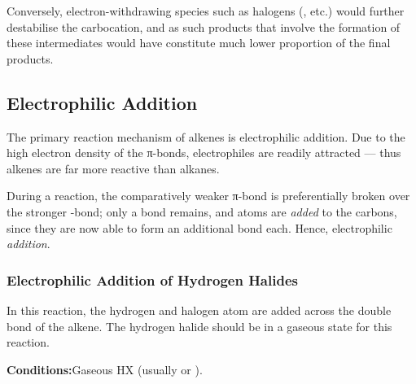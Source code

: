 		Conversely, electron-withdrawing species such as halogens (,  etc.) would further destabilise
		the carbocation, and as such products that involve the formation of these intermediates would have constitute much
		lower proportion of the final products.


\pagebreak
\subsection{Electrophilic Addition}

	The primary reaction mechanism of alkenes is electrophilic addition. Due to the high electron density of the π-bonds,
	electrophiles are readily attracted –– thus alkenes are far more reactive than alkanes.

	During a reaction, the comparatively weaker π-bond is preferentially broken over the stronger \chemsigma-bond; only a
	 bond remains, and atoms are \textit{added} to the carbons, since they are now able to form an additional
	bond each. Hence, electrophilic \textit{addition}.






	\subsubsection{Electrophilic Addition of Hydrogen Halides}

		In this reaction, the hydrogen and halogen atom are added across the double bond of the alkene. The hydrogen halide
		should be in a gaseous state for this reaction.

		\vspace{1.5em}
		\vbox{\textbf{Conditions:}\tabto{35mm}Gaseous HX (usually  or ).}
		\vspace{1.0em}




